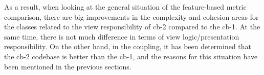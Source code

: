 As a result, when looking at the general situation of the feature-based metric comparison, there are big improvements in the complexity and cohesion areas for the classes related to the view responsibility of cb-2 compared to the cb-1. At the same time, there is not much difference in terms of view logic/presentation responsibility. On the other hand, in the coupling, it has been determined that the cb-2 codebase is better than the cb-1, and the reasons for this situation have been mentioned in the previous sections.